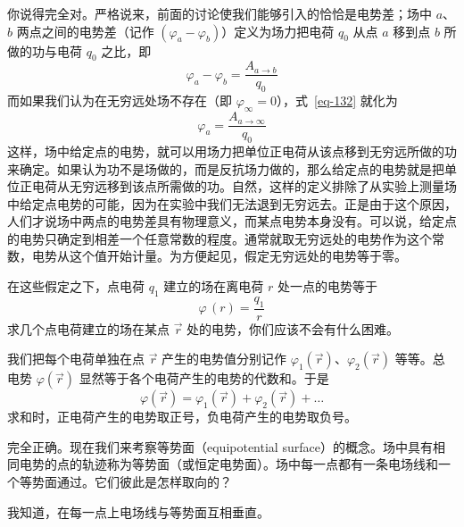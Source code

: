 \begin{dialogue}
\tchr 你说得完全对。严格说来，前面的讨论使我们能够引入的恰恰是电势差；场中 $a$、$b$ 两点之间的电势差（记作 $\left( \varphi_{a}-\varphi_{b} \right)$）定义为场力把电荷 $q_{0}$ 从点 $a$ 移到点 $b$ 所做的功与电荷 $q_{0}$ 之比，即
\begin{equation}%
\varphi_{a}-\varphi_{b}  = \frac{A_{a \to b}}{q_{0}}
\label{eq-132}
\end{equation}
而如果我们认为在无穷远处场不存在（即 $\varphi_{\infty}=0$），式~\eqref{eq-132} 就化为
\begin{equation}%
\varphi_{a} = \frac{A_{a \to \infty}}{q_{0}}
\label{eq-133}
\end{equation}
这样，场中给定点的电势，就可以用场力把单位正电荷从该点移到无穷远所做的功来确定。如果认为功不是场做的，而是反抗场力做的，那么给定点的电势就是把单位正电荷从无穷远移到该点所需做的功。自然，这样的定义排除了从实验上测量场中给定点电势的可能，因为在实验中我们无法退到无穷远去。正是由于这个原因，人们才说场中两点的电势差具有物理意义，而某点电势本身没有。可以说，给定点的电势只确定到相差一个任意常数的程度。通常就取无穷远处的电势作为这个常数，电势从这个值开始计量。为方便起见，假定无穷远处的电势等于零。

在这些假定之下，点电荷 $q_{1}$ 建立的场在离电荷 $r$ 处一点的电势等于
\begin{equation}%
\varphi\,(r) = \frac{q_{1}}{r}
\label{eq-134}
\end{equation}
求几个点电荷建立的场在某点 $\vec{r}$ 处的电势，你们应该不会有什么困难。

\stdb 我们把每个电荷单独在点 $\vec{r}$ 产生的电势值分别记作 $\varphi_{1}(\vec{r})$、$\varphi_{2}(\vec{r})$ 等等。总电势 $\varphi (\vec{r})$ 显然等于各个电荷产生的电势的代数和。于是
\begin{equation}
\varphi (\vec{r}) = \varphi_{1}(\vec{r}) + \varphi_{2}(\vec{r}) + \ldots
\label{eq-135}
\end{equation}
求和时，正电荷产生的电势取正号，负电荷产生的电势取负号。

\tchr 完全正确。现在我们来考察等势面（equipotential surface）的概念。场中具有相同电势的点的轨迹称为等势面（或恒定电势面）。场中每一点都有一条电场线和一个等势面通过。它们彼此是怎样取向的？

\stdb 我知道，在每一点上电场线与等势面互相垂直。


\end{dialogue}
